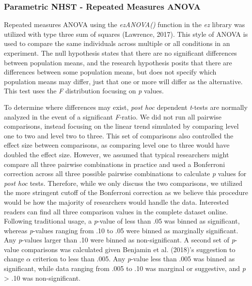 \documentclass[,man, mask]{apa6}
\begin{document}
\hypertarget{parametric-nhst---repeated-measures-anova}{%
\subsubsection{Parametric NHST - Repeated Measures ANOVA}\label{parametric-nhst---repeated-measures-anova}}

Repeated measures ANOVA using the \emph{ezANOVA()} function in the \emph{ez} library was utilized with type three sum of squares (Lawrence, 2017). This style of ANOVA is used to compare the same individuals across multiple or all conditions in an experiment. The null hypothesis states that there are no significant differences between population means, and the research hypothesis posits that there are differences between some population means, but does not specify which population means may differ, just that one or more will differ as the alternative. This test uses the \emph{F} distribution focusing on \emph{p} values.

To determine where differences may exist, \emph{post hoc} dependent \emph{t}-tests are normally analyzed in the event of a significant \emph{F}-ratio. We did not run all pairwise comparisons, instead focusing on the linear trend simulated by comparing level one to two and level two to three. This set of comparisons also controlled the effect size between comparisons, as comparing level one to three would have doubled the effect size. However, we assumed that typical researchers might compare all three pairwise combinations in practice and used a Bonferroni correction across all three possible pairwise combinations to calculate \emph{p} values for \emph{post hoc} tests. Therefore, while we only discuss the two comparisons, we utilized the more stringent cutoff of the Bonferroni correction as we believe this procedure would be how the majority of researchers would handle the data. Interested readers can find all three comparison values in the complete dataset online. Following traditional usage, a \emph{p}-value of less than .05 was binned as significant, whereas \emph{p}-values ranging from .10 to .05 were binned as marginally significant. Any \emph{p}-values larger than .10 were binned as non-significant. A second set of \emph{p}-value comparisons was calculated given Benjamin et al. (2018)'s suggestion to change \(\alpha\) criterion to less than .005. Any \emph{p}-value less than .005 was binned as significant, while data ranging from .005 to .10 was marginal or suggestive, and \emph{p} \textgreater{} .10 was non-significant.
\end{document}
